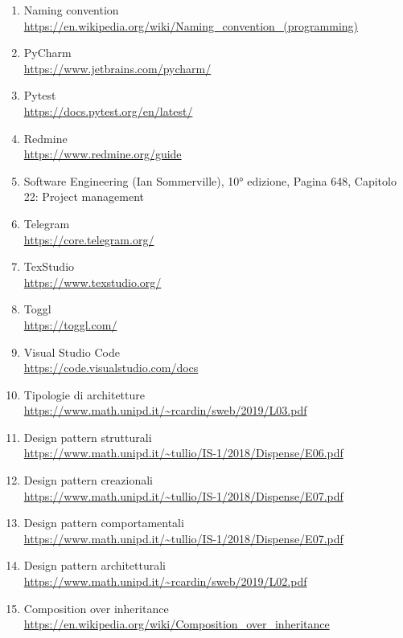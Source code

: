 \begin{enumerate}
        \item Naming convention \\\url{https://en.wikipedia.org/wiki/Naming_convention_(programming)}
        \item PyCharm \\\url{https://www.jetbrains.com/pycharm/}
		\item Pytest \\\url{https://docs.pytest.org/en/latest/}
		\item Redmine \\\url{https://www.redmine.org/guide}
        \item Software Engineering (Ian Sommerville), 10° edizione,
        Pagina 648, Capitolo 22: Project management
		\item Telegram \\\url{https://core.telegram.org/}
        \item TexStudio \\\url{https://www.texstudio.org/}
        \item Toggl \\\url{https://toggl.com/}
        \item Visual Studio Code \\\url{https://code.visualstudio.com/docs}
        \item Tipologie di architetture \\\url{https://www.math.unipd.it/~rcardin/sweb/2019/L03.pdf}
        \item Design pattern strutturali \\\url{https://www.math.unipd.it/~tullio/IS-1/2018/Dispense/E06.pdf}
        \item Design pattern creazionali \\\url{https://www.math.unipd.it/~tullio/IS-1/2018/Dispense/E07.pdf}
        \item Design pattern comportamentali \\\url{https://www.math.unipd.it/~tullio/IS-1/2018/Dispense/E07.pdf}
        \item Design pattern architetturali \\\url{https://www.math.unipd.it/~rcardin/sweb/2019/L02.pdf}
        \item Composition over inheritance \\\url{https://en.wikipedia.org/wiki/Composition_over_inheritance}

\end{enumerate}
